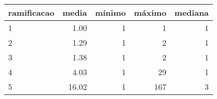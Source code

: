 \begin{table}[ht]
\centering
\begin{tabular}{lrrrr}
  \hline
ramificacao & media & mínimo & máximo & mediana \\ 
  \hline
1 & 1.00 &   1 &   1 &   1 \\ 
  2 & 1.29 &   1 &   2 &   1 \\ 
  3 & 1.38 &   1 &   2 &   1 \\ 
  4 & 4.03 &   1 &  29 &   1 \\ 
  5 & 16.02 &   1 & 167 &   3 \\ 
   \hline
\end{tabular}
\end{table}
